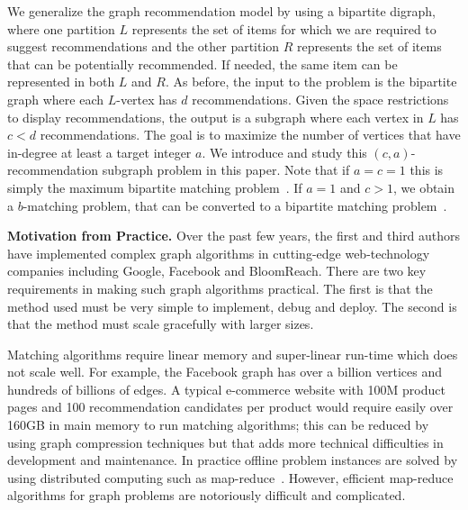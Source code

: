 We generalize the graph recommendation model by using a bipartite digraph, where one partition $L$ represents the set of items for which we are required to suggest
recommendations and the other partition $R$ represents the set of items that can be potentially recommended. If needed, the same item can be represented in both $L$ and $R$.  As before, the input to the problem is the bipartite graph where each $L$-vertex has $d$ recommendations. Given the space restrictions to display recommendations, the output is a subgraph where each vertex in $L$ has $c < d$ recommendations. The goal is to maximize the number of vertices that have in-degree at least a target integer $a$. We introduce and study this $(c, a)$-recommendation subgraph problem in this paper.  Note that if $a=c=1$ this is simply the maximum bipartite matching problem~\cite{LovaszPlummer1986}. If $a=1$ and $c > 1$, we obtain a $b$-matching problem, that can be converted to a bipartite matching problem~\cite{Gabow1983}.\vs

\noindent
{\bf Motivation from Practice.} Over the past few years, the first and
third authors have implemented complex graph algorithms in
cutting-edge web-technology companies including Google, Facebook and
BloomReach. There are two key requirements in making such graph algorithms
practical. The first is that the method used must be very simple to
implement, debug and deploy. The second is that the method must scale
gracefully with larger sizes. \vs

Matching algorithms require linear memory and super-linear run-time
which does not scale well. For example, the Facebook graph has over a
billion vertices\cite{FacebookNodes} and hundreds of billions of edges. A typical
e-commerce website with 100M product pages and 100 recommendation candidates per
product would require easily over 160GB in main memory to run matching
algorithms; this can be reduced by using graph compression techniques but that adds more technical difficulties in development and maintenance. In practice offline problem instances are solved by using distributed computing such as map-reduce~\cite{DeanGhemawat2004}. However, efficient map-reduce algorithms for graph problems are notoriously difficult and complicated. \vs


